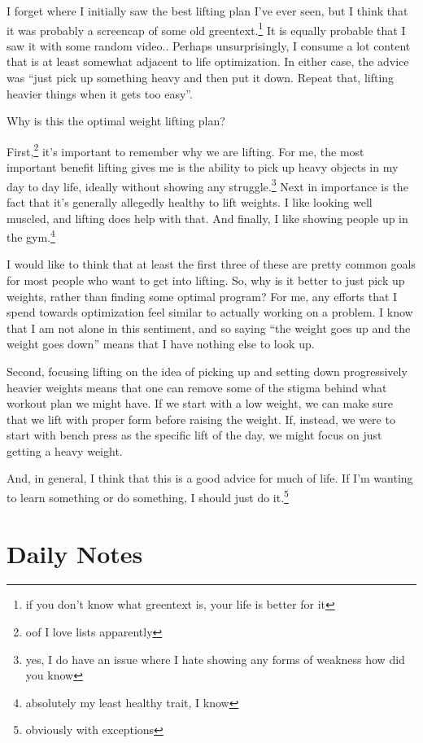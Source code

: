 \documentclass[12pt]{article}
\newcommand{\say}[1]{``#1''}
\renewcommand{\,}{\textsuperscript{,}}
\begin{document}
I forget where I initially saw the best lifting plan I've ever seen, but I think that it was probably a screencap of some old greentext.\footnote{if you don't know what greentext is, your life is better for it}  
It is equally probable that I saw it with some random video..  
Perhaps unsurprisingly, I consume a lot content that is at least somewhat adjacent to life optimization.  
In either case, the advice was \say{just pick up something heavy and then put it down. Repeat that, lifting heavier things when it gets too easy}.

Why is this the optimal weight lifting plan?

First,\footnote{oof I love lists apparently} it's important to remember why we are lifting.  
For me, the most important benefit lifting gives me is the ability to pick up heavy objects in my day to day life, ideally without showing any struggle.\footnote{yes, I do have an issue where I hate showing any forms of weakness how did you know}  
Next in importance is the fact that it's generally allegedly healthy to lift weights.  
I like looking well muscled, and lifting does help with that.  
And finally, I like showing people up in the gym.\footnote{absolutely my least healthy trait, I know}

I would like to think that at least the first three of these are pretty common goals for most people who want to get into lifting.  
So, why is it better to just pick up weights, rather than finding some optimal program?  
For me, any efforts that I spend towards optimization feel similar to actually working on a problem.  
I know that I am not alone in this sentiment, and so saying \say{the weight goes up and the weight goes down} means that I have nothing else to look up.

Second, focusing lifting on the idea of picking up and setting down progressively heavier weights means that one can remove some of the stigma behind what workout plan we might have.  
If we start with a low weight, we can make sure that we lift with proper form before raising the weight.  
If, instead, we were to start with bench press as the specific lift of the day, we might focus on just getting a heavy weight.

And, in general, I think that this is a good advice for much of life.  
If I'm wanting to learn something or do something, I should just do it.\footnote{obviously with exceptions}

\section{Daily Notes}
\end{document}
